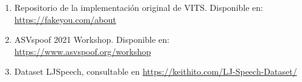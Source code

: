 \begin{enumerate}
\label{RES_7}
\item{Repositorio de la implementación original de VITS. Disponible en: \url{https://fakeyou.com/about}}




\label{CON_1}
\item{ASVspoof 2021 Workshop. Disponible en: \url{https://www.asvspoof.org/workshop}}



\label{AX_1}
\item{Dataset LJSpeech, consultable en \url{https://keithito.com/LJ-Speech-Dataset/}}


\end{enumerate}
\newpage 